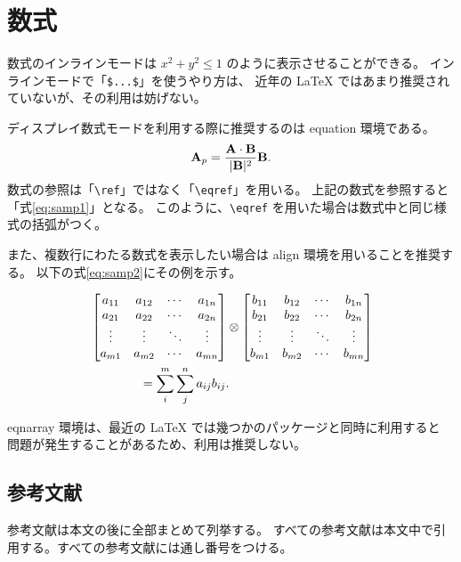 \section{数式}
数式のインラインモードは \(x^2 + y^2 \leq 1\) のように表示させることができる。
インラインモードで「\verb+$...$+」を使うやり方は、
近年の LaTeX ではあまり推奨されていないが、その利用は妨げない。

ディスプレイ数式モードを利用する際に推奨するのは equation 環境である。
\begin{equation}
	\mathbf{A}_p = \frac{\mathbf{A}\cdot\mathbf{B}}{|\mathbf{B}|^2}\mathbf{B} .
	\label{eq:samp1}
\end{equation}
数式の参照は「\verb+\ref+」ではなく「\verb+\eqref+」を用いる。
上記の数式を参照すると「式\eqref{eq:samp1}」となる。
このように、\verb+\eqref+ を用いた場合は数式中と同じ様式の括弧がつく。

また、複数行にわたる数式を表示したい場合は align 環境を用いることを推奨する。
以下の式\eqref{eq:samp2}にその例を示す。

\begin{align}
	& \begin{bmatrix}
	a_{11} & a_{12} & \cdots & a_{1n} \\
	a_{21} & a_{22} & \cdots & a_{2n} \\
	\vdots & \vdots & \ddots & \vdots \\
	a_{m1} & a_{m2} & \cdots & a_{mn} \\
	\end{bmatrix}
	\otimes
	\begin{bmatrix}
	b_{11} & b_{12} & \cdots & b_{1n} \\
	b_{21} & b_{22} & \cdots & b_{2n} \\
	\vdots & \vdots & \ddots & \vdots \\
	b_{m1} & b_{m2} & \cdots & b_{mn} \\
	\end{bmatrix} \notag \\
	& \qquad \qquad = \sum_{i}^{m}\sum_{j}^{n}a_{ij}b_{ij} .
	\label{eq:samp2}
\end{align}

eqnarray 環境は、最近の LaTeX では幾つかのパッケージと同時に利用すると
問題が発生することがあるため、利用は推奨しない。

\subsection{参考文献}
参考文献は本文の後に全部まとめて列挙する。
すべての参考文献は本文中で引用する。すべての参考文献には通し番号をつける。

